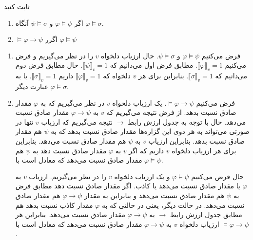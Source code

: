 ثابت کنید
\begin{enumerate}[label=(\alph*)]
\item
اگر
$\varphi\models\psi$
و
$\psi\models\sigma$
آنگاه
$\varphi\models\sigma$.

\item
$\models\varphi\to\psi$
اگرر
$\varphi\models\psi$
\end{enumerate}\quad\vspace{-9mm}
\begin{ans}
\begin{enumerate}[label=(\alph*)]
\item
فرض می‌کنیم $\varphi\models\psi$
و
$\psi\models\sigma$.
حال ارزیاب دلخواه $v$ را در نظر می‌گیریم و فرض می‌کنیم $\llbracket\varphi\rrbracket_v=1$. مطابق فرض اول می‌دانیم که
$\llbracket\psi\rrbracket_v=1$. حال مطابق فرض دوم می‌دانیم که
$\llbracket\sigma\rrbracket_v=1$.
بنابراین برای هر $v$ دلخواه که $\llbracket\varphi\rrbracket_v=1$ داریم
$\llbracket\sigma\rrbracket_v=1$.
یا به عبارت دیگر
$\varphi\models\sigma$.
\item
فرض می‌کنیم $\models\varphi\to\psi$. یک ارزیاب دلخواه $v$ در نظر می‌گیریم که به $\varphi$ مقدار صادق نسبت بدهد. از فرض نتیجه می‌گیریم که $v$ به $\varphi\to\psi$ مقدار صادق نسبت می‌دهد. حال با توجه به جدول ارزش رابط $\to$ نتیجه می‌گیریم که ارزیاب $v$ تنها در صورتی می‌تواند به هر دوی این گزاره‌ها مقدار صادق نسبت بدهد که به $\psi$ هم مقدار صادق نسبت بدهد. بنابراین ارزیاب $v$ به $\psi$ هم مقدار صادق نسبت می‌دهد. بنابراین برای هر ارزیاب دلخواه $v$ داریم که اگر $v$ به $\varphi$ مقدار صادق نسبت دهد به $\psi$ هم مقدار صادق نسبت می‌دهد که معادل است با $\varphi\models\psi$.

حال فرض می‌کنیم
$\varphi\models\psi$
و یک ارزیاب دلخواه $v$ را در نظر می‌گیریم. ارزیاب $v$ به $\varphi$ یا مقدار صادق نسبت می‌دهد یا کاذب. اگر مقدار صادق نسبت دهد مطابق فرض به $\psi$ هم مقدار صادق نسبت می‌دهد و بنابراین به مقدار $\varphi\to\psi$ هم مقدار صادق نسبت می‌دهد. در حالت دیگر، یعنی در حالتی که به $\varphi$ مقدار کاذب نسبت بدهد هم مطابق جدول ارزش رابط $\to$ به $\varphi\to\psi$ مقدار صادق نسبت می‌دهد. بنابراین هر ارزیاب دلخواه $v$ به $\varphi\to\psi$ مقدار صادق نسبت می‌دهد که معادل است با $\models\varphi\to\psi$.
\end{enumerate}
\end{ans}
